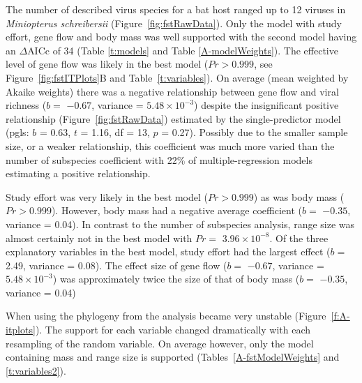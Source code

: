 The number of described virus species for a bat host ranged up to 12 viruses in \emph{Miniopterus schreibersii} (Figure~\ref{fig:fstRawData}).
Only the model with study effort, gene flow and body mass was well supported with the second model having an $\Delta\text{AICc}$ of 34 (Table \ref{t:models} and Table \ref{A-modelWeights}).
The effective level of gene flow was likely in the best model ($Pr > 0.999$, see Figure~\ref{fig:fstITPlots}B and Table~\ref{t:variables}).
On average (mean weighted by Akaike weights) there was a negative relationship between gene flow and viral richness ($b = $ \ensuremath{-0.67}, variance = \ensuremath{5.48\times 10^{-3}}) despite the insignificant positive relationship (Figure~\ref{fig:fstRawData}) estimated by the single-predictor model (pgls: $b$ = 0.63, $t$ = 1.16, df = 13, $p$ = 0.27).
Possibly due to the smaller sample size, or a weaker relationship, this coefficient was much more varied than the number of subspecies coefficient with 22\% of multiple-regression models estimating a positive relationship.

Study effort was very likely in the best model ($Pr > 0.999$) as was body mass ($Pr > 0.999$).
However, body mass had a negative average coefficient ($b = $ \ensuremath{-0.35}, variance = 0.04). %
In contrast to the number of subspecies analysis, range size was almost certainly not in the best model with $Pr = $ \ensuremath{3.96\times 10^{-8}}.
Of the three explanatory variables in the best model, study effort had the largest effect ($b = $ 2.49, variance = 0.08).
The effect size of gene flow ($b = $ \ensuremath{-0.67}, variance = \ensuremath{5.48\times 10^{-3}}) was approximately twice the size of that of body mass ($b = $ \ensuremath{-0.35}, variance = 0.04)



When using the phylogeny from \textcite{jones2005bats} the analysis became very unstable (Figure~\ref{f:A-itplots}).
The support for each variable changed dramatically with each resampling of the random variable.
On average however, only the model containing mass and range size is supported (Tables~\ref{A-fstModelWeights} and \ref{t:variables2}).



